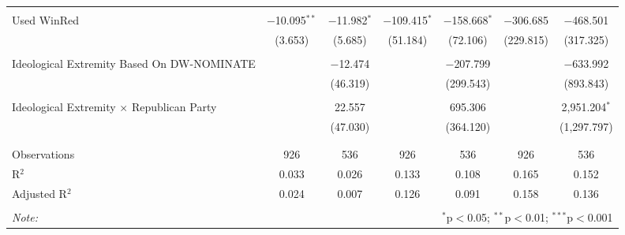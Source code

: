 \begin{tabular}{@{\extracolsep{5pt}}lcccccc}
  & & & & & & \\ 
 Used WinRed & $-$10.095$^{**}$ & $-$11.982$^{*}$ & $-$109.415$^{*}$ & $-$158.668$^{*}$ & $-$306.685 & $-$468.501 \\ 
  & (3.653) & (5.685) & (51.184) & (72.106) & (229.815) & (317.325) \\ 
  & & & & & & \\ 
 Ideological Extremity Based On DW-NOMINATE &  & $-$12.474 &  & $-$207.799 &  & $-$633.992 \\ 
  &  & (46.319) &  & (299.543) &  & (893.843) \\ 
  & & & & & & \\ 
 Ideological Extremity $\times$ Republican Party &  & 22.557 &  & 695.306 &  & 2,951.204$^{*}$ \\ 
  &  & (47.030) &  & (364.120) &  & (1,297.797) \\ 
  & & & & & & \\ 
\hline \\[-1.8ex] 
Observations & 926 & 536 & 926 & 536 & 926 & 536 \\ 
R$^{2}$ & 0.033 & 0.026 & 0.133 & 0.108 & 0.165 & 0.152 \\ 
Adjusted R$^{2}$ & 0.024 & 0.007 & 0.126 & 0.091 & 0.158 & 0.136 \\ 
\hline 
\hline \\[-1.8ex] 
\textit{Note:}  & \multicolumn{6}{r}{$^{*}$p$<$0.05; $^{**}$p$<$0.01; $^{***}$p$<$0.001} \\ 
\end{tabular} 
